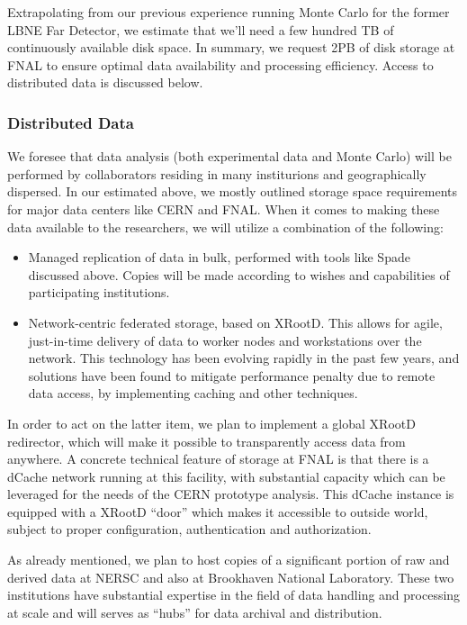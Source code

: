 Extrapolating from our previous experience running Monte Carlo for the former LBNE Far Detector, we estimate that we'll need a few hundred TB of continuously available
disk space. In summary, we request 2PB of disk storage at FNAL to ensure optimal data availability and processing efficiency. Access to distributed data is discussed below.

\subsubsection{Distributed Data}
We foresee that data analysis (both experimental data and Monte Carlo) will be performed by collaborators residing in many institurions and geographically dispersed. In our
estimated above, we mostly outlined storage space requirements for major data centers like CERN and FNAL. When it comes to making these data available to the researchers,
we will utilize a combination of the following:
\begin{itemize}
\item Managed replication of data in bulk, performed with tools like Spade discussed above. Copies will be made according to wishes and capabilities of participating institutions.
\item Network-centric federated storage, based on XRootD. This allows for agile, just-in-time delivery of data to worker nodes and workstations over the network. This
technology has been evolving rapidly in the past few years, and solutions have been found to mitigate performance penalty due to remote data access, by implementing caching
and other techniques.
\end{itemize}

In order to act on the latter item, we plan to implement a global XRootD redirector, which will make it possible to transparently access data from anywhere.
A concrete technical feature of storage at FNAL is that there is a dCache network running at this facility, with substantial capacity which can be leveraged
for the needs of the CERN prototype analysis. This dCache instance is equipped with a XRootD ``door'' which makes it accessible to outside world, subject
to proper configuration, authentication and authorization.

As already mentioned, we plan to host copies of a significant portion of raw and derived data at NERSC and also at Brookhaven National Laboratory.
These two institutions have substantial expertise  in the field of data handling and processing at scale and will serves as ``hubs'' for data archival and
distribution.




%

